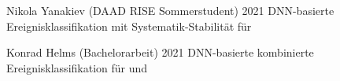 \begin{cvhonors}[1mm]
  \cvhonor
    {Nikola Yanakiev \textmd{(DAAD RISE Sommerstudent)}} %
    {} %
    {} %
    {2021} %
    {DNN-basierte Ereignisklassifikation mit Systematik-Stabilit\"at f\"ur \ttHbb}

  \cvhonor
    {Konrad Helms \textmd{(Bachelorarbeit)}} %
    {} %
    {} %
    {2021} %
    {DNN-basierte kombinierte Ereignisklassifikation f\"ur \ttHbb und \tHbb}

\end{cvhonors}
